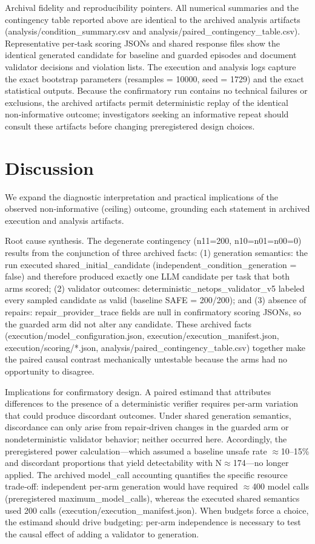 \documentclass[conference]{IEEEtran}
\begin{document}
Archival fidelity and reproducibility pointers. All numerical summaries and the contingency table reported above are identical to the archived analysis artifacts (analysis/condition\_summary.csv and analysis/paired\_contingency\_table.csv). Representative per‑task scoring JSONs and shared response files show the identical generated candidate for baseline and guarded episodes and document validator decisions and violation lists. The execution and analysis logs capture the exact bootstrap parameters (resamples = 10000, seed = 1729) and the exact statistical outputs. Because the confirmatory run contains no technical failures or exclusions, the archived artifacts permit deterministic replay of the identical non‑informative outcome; investigators seeking an informative repeat should consult these artifacts before changing preregistered design choices.

\section{Discussion}
We expand the diagnostic interpretation and practical implications of the observed non‑informative (ceiling) outcome, grounding each statement in archived execution and analysis artifacts.

Root cause synthesis. The degenerate contingency (n11=200, n10=n01=n00=0) results from the conjunction of three archived facts: (1) generation semantics: the run executed shared\_initial\_candidate (independent\_condition\_generation = false) and therefore produced exactly one LLM candidate per task that both arms scored; (2) validator outcomes: deterministic\_netops\_validator\_v5 labeled every sampled candidate as valid (baseline SAFE = 200/200); and (3) absence of repairs: repair\_provider\_trace fields are null in confirmatory scoring JSONs, so the guarded arm did not alter any candidate. These archived facts (execution/model\_configuration.json, execution/execution\_manifest.json, execution/scoring/*.json, analysis/paired\_contingency\_table.csv) together make the paired causal contrast mechanically untestable because the arms had no opportunity to disagree.

Implications for confirmatory design. A paired estimand that attributes differences to the presence of a deterministic verifier requires per‑arm variation that could produce discordant outcomes. Under shared generation semantics, discordance can only arise from repair‑driven changes in the guarded arm or nondeterministic validator behavior; neither occurred here. Accordingly, the preregistered power calculation---which assumed a baseline unsafe rate \ensuremath{\approx}10--15\% and discordant proportions that yield detectability with N\ensuremath{\approx}174---no longer applied. The archived model\_call accounting quantifies the specific resource trade‑off: independent per‑arm generation would have required \ensuremath{\approx}400 model calls (preregistered maximum\_model\_calls), whereas the executed shared semantics used 200 calls (execution/execution\_manifest.json). When budgets force a choice, the estimand should drive budgeting: per‑arm independence is necessary to test the causal effect of adding a validator to generation.
\end{document}
